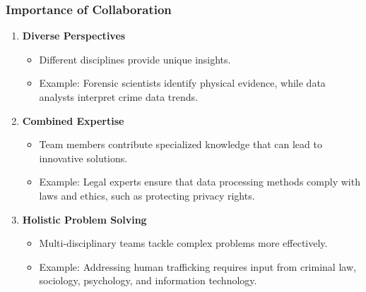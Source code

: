 \documentclass[aspectratio=169]{beamer}
\begin{document}
\begin{frame}[fragile]
    \frametitle{Importance of Collaboration}

    \begin{enumerate}
        \item \textbf{Diverse Perspectives}
            \begin{itemize}
                \item Different disciplines provide unique insights.
                \item Example: Forensic scientists identify physical evidence, while data analysts interpret crime data trends.
            \end{itemize}

        \item \textbf{Combined Expertise}
            \begin{itemize}
                \item Team members contribute specialized knowledge that can lead to innovative solutions.
                \item Example: Legal experts ensure that data processing methods comply with laws and ethics, such as protecting privacy rights.
            \end{itemize}

        \item \textbf{Holistic Problem Solving}
            \begin{itemize}
                \item Multi-disciplinary teams tackle complex problems more effectively.
                \item Example: Addressing human trafficking requires input from criminal law, sociology, psychology, and information technology.
            \end{itemize}
    \end{enumerate}
\end{frame}
\end{document}
